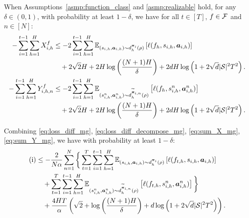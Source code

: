 \begin{lm}\label{lm:bound_X_Y_mg}
    When Assumptions~\ref{asmp:function_class} and \ref{asmp:realizable} hold, for any $\delta \in (0,1)$, with probability at least $1-\delta$, we have  for all $t\in[T]$, $ f\in{\mathcal{F}}$ and $n\in[N]$:
    \begin{align}\label{eq:sum_X_mg}
        -\sum_{i=1}^{t-1}\sum_{h=1}^H X_{i,h}^f& \leq -2\sum_{i=1}^{t-1}\sum_{h=1}^H \mathbb{E}_{(s_{i,h},{\bm{a}}_{i,h})\sim d_h^{{\bm{\pi}}_i}(\rho)}\left[\ell(f_h,s_{i,h},{\bm{a}}_{i,h})\right] \notag\\
        & \quad + 2\sqrt{2}H + 2H\log\left(\frac{(N+1)H}{\delta}\right) + 2dH\log\left(1+2\sqrt{d}|{\mathcal{S}}|^2 T^2\right) .\\ 
     -\sum_{i=1}^{t-1}\sum_{h=1}^H Y_{i,h,n}^f  & \leq -2\sum_{i=1}^{t-1}\sum_{h=1}^H \mathbb{E}_{(s_{i,h}^n,{\bm{a}}_{i,h}^n)\sim d_h^{\widetilde{{\bm{\pi}}}_{i,n}}(\rho)}\left[\ell(f_h,s_{i,h}^n,{\bm{a}}_{i,h}^n)\right] \nonumber \\
        & \quad + 2\sqrt{2}H + 2H\log\left(\frac{(N+1)H}{\delta}\right) + 2dH\log\left(1+2\sqrt{d}|{\mathcal{S}}|^2 T^2\right). \label{eq:sum_Y_mg}
    \end{align}
\end{lm}


Combining \eqref{eq:loss_diff_mg}, \eqref{eq:loss_diff_decompose_mg}, \eqref{eq:sum_X_mg}, \eqref{eq:sum_Y_mg}, we have with probability at least $1-\delta$:
\begin{align}\label{eq:a_bound}
    \text{(i)} & \leq -\frac{2}{N\alpha}\sum_{n=1}^N\bigg\{\sum_{t=1}^T\sum_{i=1}^{t-1}\sum_{h=1}^H 
    \mathbb{E}_{(s_{i,h},{\bm{a}}_{i,h})\sim d_h^{{\bm{\pi}}_i}(\rho)}\left[\ell(f_{t,h},s_{i,h},{\bm{a}}_{i,h})\right]\notag\\
  &  \quad +\sum_{t=1}^T\sum_{i=1}^{t-1}\sum_{h=1}^H 
    \mathbb{E}_{(s_{i,h}^n,{\bm{a}}_{i,h}^n)\sim d_h^{\widetilde{{\bm{\pi}}}_{i,n}}(\rho)}\left[\ell(f_{t,h},s_{i,h}^n,{\bm{a}}_{i,h}^n)\right]\bigg\}\notag\\
   & \quad + \frac{4HT}{\alpha}\left(\sqrt{2} + \log\left(\frac{(N+1)H}{\delta}\right) + d\log\left(1+2\sqrt{d}|{\mathcal{S}}|^2T^2\right)\right). 
\end{align}


